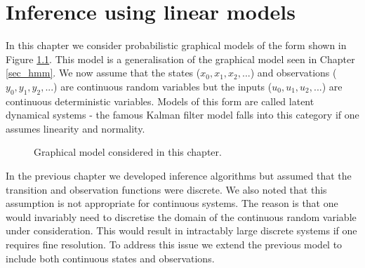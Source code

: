 \chapter{Inference using linear models}
\label{sec_inf_lin_mods}
In this chapter we consider probabilistic graphical models of the form shown in Figure \ref{fig_linmod2}. This model is a generalisation of the graphical model seen in Chapter \ref{sec_hmm}. We now assume that the states ($x_0,x_1,x_2,...$) and observations ($y_0,y_1,y_2,...$) are continuous random variables but the inputs ($u_0,u_1,u_2,...$) are continuous deterministic variables. Models of this form are called latent dynamical systems - the famous Kalman filter model falls into this category if one assumes linearity and normality.
\begin{figure}[H] 
\centering
{}
\caption{Graphical model considered in this chapter.}
\label{fig_linmod2}
\end{figure}
In the previous chapter we developed inference algorithms but assumed that the transition and observation functions were discrete. We also noted that this assumption is not appropriate for continuous systems. The reason is that one would invariably need to discretise the domain of the continuous random variable under consideration. This would result in intractably large discrete systems if one requires fine resolution. To address this issue we extend the previous model to include both continuous states and observations. 

